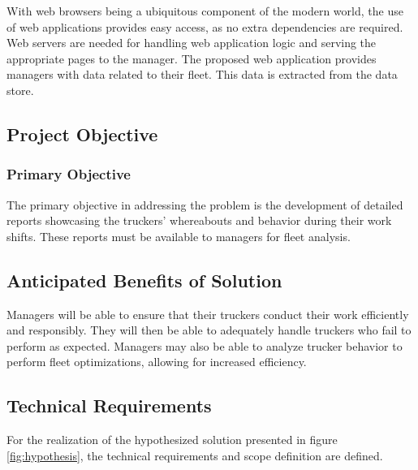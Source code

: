 With web browsers being a ubiquitous component of the modern world, the use of web applications provides easy access, as no extra dependencies are required.
Web servers are needed for handling web application logic and serving the appropriate pages to the manager.
The proposed web application provides managers with data related to their fleet.
This data is extracted from the data store.

\pagebreak
\subsection{Project Objective}
\subsubsection{Primary Objective}
The primary objective in addressing the problem is the development of detailed reports showcasing the truckers' whereabouts and behavior during their work shifts.
These reports must be available to managers for fleet analysis.

\subsection{Anticipated Benefits of Solution}
Managers will be able to ensure that their truckers conduct their work efficiently and responsibly.
They will then be able to adequately handle truckers who fail to perform as expected.
Managers may also be able to analyze trucker behavior to perform fleet optimizations, allowing for increased efficiency.

\subsection{Technical Requirements}
For the realization of the hypothesized solution presented in figure \ref{fig:hypothesis}, the technical requirements and scope definition are defined.

